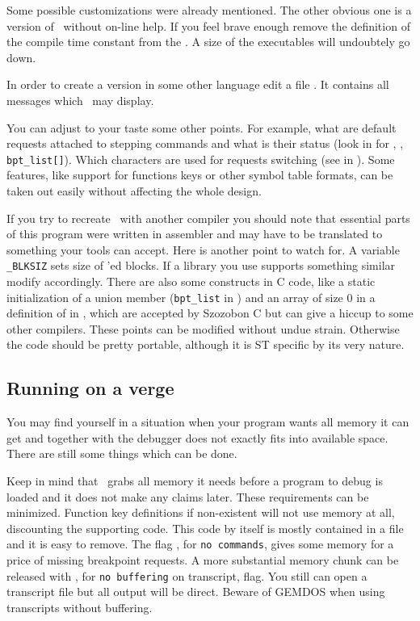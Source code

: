 Some possible customizations were already mentioned.
The other obvious one is a version of  \szadb\ without on-line help.
If you feel brave enough remove the definition of 
the compile time constant  from the .
A size of the executables will undoubtely go down.

In order to create a version in some other language edit 
a file .
It contains all messages which \szadb\ may display.

You can adjust to your taste some other points.  For example,
what are default requests attached to stepping
commands and what is their status (look in  for
, , \verb|bpt_list[]|).
Which characters are used for requests switching
(see  in ).
Some features, like support for functions keys or other symbol
table formats, can be taken out easily without affecting the
whole design.

If you try to recreate \szadb\ with another compiler you should note
that essential parts of this program were written in assembler
and may have to be translated to something your tools can accept.
Here is another point to watch for.
A variable \verb|_BLKSIZ| sets size of 'ed blocks.
If a library you use supports something similar modify
accordingly.
There are also some constructs in C code,
like a static initialization of a union member (\verb|bpt_list|
in ) and an array of size 0 in a definition
of  in , which 
are accepted by Szozobon C but can give
a hiccup to some other compilers.
These points can be modified without undue strain.
Otherwise the code should be pretty portable, although it is
ST specific by its very nature.

\subsection{Running on a verge}

You may find yourself in a situation when your program wants all
memory it can get and together with the debugger does not exactly
fits into available space.
There are still some things which can be done.

Keep in mind that \szadb\ grabs all memory it needs before a program
to debug is loaded and it does not make any claims later.
These requirements can be minimized. 
Function key definitions if non-existent will not use memory at all,
discounting the supporting code.  
This code by itself is mostly contained in a file 
and it is easy to remove.
The flag , for {\tt no commands},  gives some memory for a price
of missing breakpoint requests.
A more substantial memory chunk can be released with 
, for {\tt no buffering} on transcript, flag.
You still can open a transcript file but all output will be direct.
Beware of GEMDOS when using transcripts without buffering.

